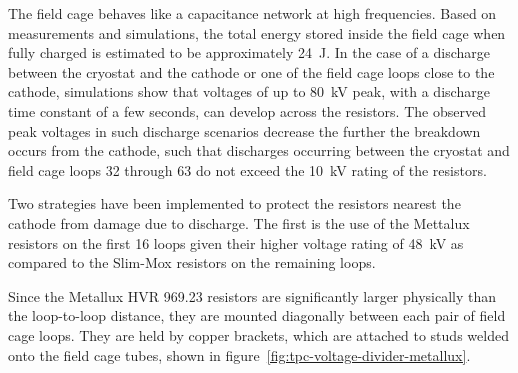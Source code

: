 The field cage behaves like a capacitance network at high frequencies. Based on measurements and simulations, the total energy stored inside the field cage when fully charged is estimated to be approximately 24~J. In the case of a discharge between the cryostat and the cathode or one of the field cage loops close to the cathode, simulations show that voltages of up to 80~kV peak, with a discharge time constant of a few seconds, can develop across the resistors. The observed peak voltages in such discharge scenarios decrease the further the breakdown occurs from the cathode, such that discharges occurring between the cryostat and field cage loops 32 through 63 do not exceed the 10~kV rating of the resistors.

Two strategies have been implemented to protect the resistors nearest the cathode from damage due to discharge.   The first is the use of the Mettalux resistors on the first 16 loops given their higher voltage rating of 48~kV as compared to the Slim-Mox resistors on the remaining loops.      



Since the Metallux HVR 969.23 resistors are significantly larger physically than the loop-to-loop distance, they are mounted diagonally between each pair of field cage loops. They are held by copper brackets, which are attached to studs welded onto the field cage tubes, shown in figure~\ref{fig:tpc-voltage-divider-metallux}.

